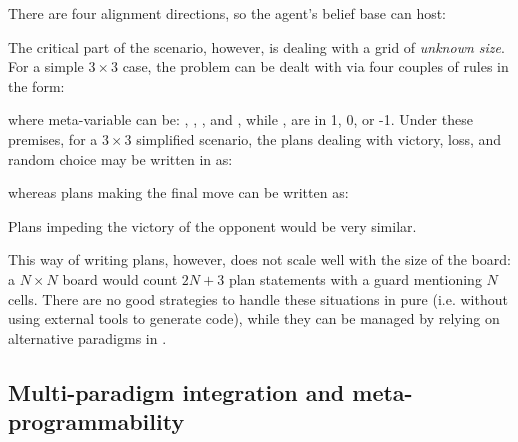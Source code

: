 There are four alignment directions, so the agent's belief base can host:
\\
\begin{minipage}[c]{\textwidth}
\end{minipage}
%
The critical part of the scenario, however, is dealing with a grid of \emph{unknown size}.
%
For a simple $3 \times 3$ case, the problem can be dealt with via four couples of rules in the form:
\\
\begin{minipage}[c]{\textwidth}
\end{minipage}
%
where meta-variable  can be:
,
,
,
and ,
while ,
 are in 1, 0, or -1.
%
Under these premises, for a $3 \times 3$ simplified scenario,
the plans dealing with victory, loss, and random choice may be written in \jason{} as:
\\
\begin{minipage}[c]{\textwidth}
\end{minipage}
%
whereas plans making the final move can be written as:
\\
\begin{minipage}[c]{\textwidth}
\end{minipage}
%
Plans impeding the victory of the opponent would be very similar.

This way of writing plans, however, does not scale well with the size of the board:
a $N \times N$ board would count $2N + 3$ plan statements with a guard mentioning $N$ cells.
%
%
There are no good strategies to handle these situations in pure \jason{} (i.e. without using external tools to generate code), while they can be managed by relying on alternative paradigms in \jakta{}.

\subsection{Multi-paradigm integration and meta-programmability}\label{subsec:behaviour-parametrization}

